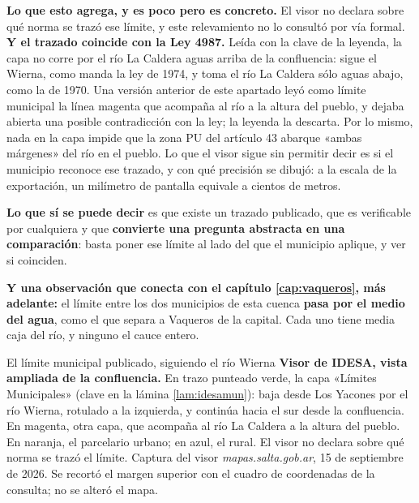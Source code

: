 \begin{cautela}
\textbf{Lo que esto agrega, y es poco pero es concreto.} El visor no declara sobre qué norma se
trazó ese límite, y este relevamiento no lo consultó por vía formal. \textbf{Y el trazado coincide con la Ley 4987.} Leída con la clave de la leyenda, la capa no corre por el río La Caldera aguas arriba de la confluencia: sigue el Wierna, como manda la ley de 1974, y toma el río La Caldera sólo aguas abajo, como la de 1970. Una versión anterior de este apartado leyó como límite municipal la línea magenta que acompaña al río a la altura del pueblo, y dejaba abierta una posible contradicción con la ley; la leyenda la descarta. Por lo mismo, nada en la capa impide que la zona PU del artículo 43 abarque «ambas márgenes» del río en el pueblo. Lo que el visor sigue sin permitir decir es si el municipio reconoce ese trazado, y con qué precisión se dibujó: a la escala de la exportación, un milímetro de pantalla equivale a cientos de metros.

\textbf{Lo que sí se puede decir} es que existe un trazado publicado, que es verificable por
cualquiera y que \textbf{convierte una pregunta abstracta en una comparación}: basta poner ese
límite al lado del que el municipio aplique, y ver si coinciden.

\textbf{Y una observación que conecta con el capítulo \ref{cap:vaqueros}, más adelante:} el límite entre los dos municipios de esta cuenca \textbf{pasa por el medio del agua}, como el que separa a Vaqueros de la capital. Cada uno tiene media caja del río, y ninguno el cauce entero.
\end{cautela}

%
{El límite municipal publicado, siguiendo el río Wierna}%
{\textbf{Visor de IDESA, vista ampliada de la confluencia.} En trazo punteado verde, la capa «Límites Municipales» (clave en la lámina \ref{lam:idesamun}): baja desde Los Yacones por el río Wierna, rotulado a la izquierda, y continúa hacia el sur desde la confluencia. En magenta, otra capa, que acompaña al río La Caldera a la altura del pueblo. En naranja, el parcelario urbano; en azul, el rural. El visor no declara sobre qué norma se trazó el límite.}%
{Captura del visor \textit{mapas.salta.gob.ar}, 15 de septiembre de 2026. Se recortó el margen
superior con el cuadro de coordenadas de la consulta; no se alteró el mapa.}

